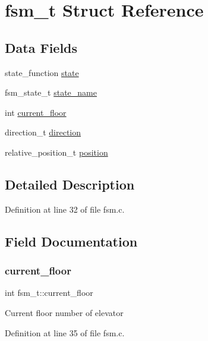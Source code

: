 \hypertarget{structfsm__t}{}\section{fsm\+\_\+t Struct Reference}
\label{structfsm__t}
\subsection*{Data Fields}
\begin{DoxyCompactItemize}
\item 
state\+\_\+function \hyperlink{structfsm__t_a712771896c61fba0983cdf9bb7c5aef3}{state}
\item 
fsm\+\_\+state\+\_\+t \hyperlink{structfsm__t_a2ee302f4baedf2779e08f3d0cba24ae1}{state\+\_\+name}
\item 
int \hyperlink{structfsm__t_a39d1b1b17a203c65eef47e1c20f81b2c}{current\+\_\+floor}
\item 
direction\+\_\+t \hyperlink{structfsm__t_a4a22f2e6606e51b6d83309023ac1b4fc}{direction}
\item 
relative\+\_\+position\+\_\+t \hyperlink{structfsm__t_ad6a67b3201e4002d25f058bb8bf9ffd5}{position}
\end{DoxyCompactItemize}


\subsection{Detailed Description}


Definition at line 32 of file fsm.\+c.



\subsection{Field Documentation}
\mbox{\label{structfsm__t_a39d1b1b17a203c65eef47e1c20f81b2c}} 
\subsubsection{\texorpdfstring{current\+\_\+floor}{current\_floor}}
{\footnotesize\ttfamily int fsm\+\_\+t\+::current\+\_\+floor}

Current floor number of elevator 

Definition at line 35 of file fsm.\+c.

